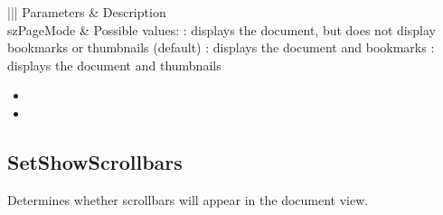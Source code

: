 \documentclass[letterpaper,12pt,english,openany,oneside]{sphinxmanual}
\begin{document}

\begin{sphinxVerbatim}[commandchars=\\\{\}]
  
\end{sphinxVerbatim}
\label{\detokenize{IAC_API_OLE_Objects:parameters-88}}


\begin{savenotes}\sphinxattablestart
\centering
{}\label{\detokenize{IAC_API_OLE_Objects:section-103}}\nobreak
\begin{tabular}[t]{|||}
\hline
\sphinxstyletheadfamily 
Parameters
&\sphinxstyletheadfamily 
Description
\\
\hline
szPageMode
&
Possible values:  : displays the document, but does not display bookmarks or thumbnails (default)  : displays the document and bookmarks  : displays the document and thumbnails
\\
\hline
\end{tabular}
\par
\sphinxattableend\end{savenotes}
\label{\detokenize{IAC_API_OLE_Objects:related-methods-149}}
\begin{itemize}
\item {} 
 

\item {} 
 

\end{itemize}




\subsection{SetShowScrollbars}
\label{\detokenize{IAC_API_OLE_Objects:setshowscrollbars}}
Determines whether scrollbars will appear in the document view.


\begin{sphinxVerbatim}[commandchars=\\\{\}]
  
\end{sphinxVerbatim}
\label{\detokenize{IAC_API_OLE_Objects:parameters-89}}
\end{document}

